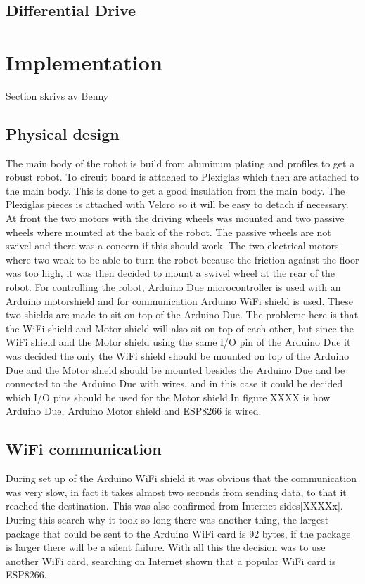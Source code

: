 \documentclass[11pt]{article}
\begin{document}
\subsection{Differential Drive}

\section{Implementation}
Section skrivs av Benny
\subsection{Physical design}
The main body of the robot is build from aluminum plating and profiles to get a robust robot. To circuit board is attached to Plexiglas which then are attached to the main body. This is done to get a good insulation from the main body. The Plexiglas pieces is attached with Velcro so it will be easy to detach if necessary. At front the two motors with the driving wheels was mounted and two passive wheels where mounted at the back of the robot. The passive wheels are not swivel and there was a concern if this should work. The two electrical motors where two weak to be able to turn the robot because the friction against the floor was too high, it was then decided to mount a swivel wheel at the rear of the robot. 
For controlling the robot, Arduino Due microcontroller is used with an Arduino motorshield and for communication Arduino WiFi shield is used. These two shields are made to sit on top of the Arduino Due. The probleme here is that the WiFi shield and Motor shield will also sit on top of each other, but since the WiFi shield and the Motor shield using the same I/O pin of the Arduino Due it was decided the only the WiFi shield should be mounted on top of the Arduino Due and the Motor shield should be mounted besides the Arduino Due and be connected to the Arduino Due with wires, and in this case it could be decided which I/O pins should be used for the Motor shield.In figure XXXX is how Arduino Due, Arduino Motor shield and ESP8266 is wired.

\subsection{WiFi communication}
During set up of the Arduino WiFi shield it was obvious that the communication was very slow, in fact it takes almost two seconds from sending data, to that it reached the destination. This was also confirmed from Internet sides[XXXXx]. During this search why it took so long there was another thing, the largest package that could be sent to the Arduino WiFi card is 92 bytes, if the package is larger there will be a silent failure. With all this the decision was to use another WiFi card, searching on Internet shown that a popular WiFi card is ESP8266.
\end{document}
